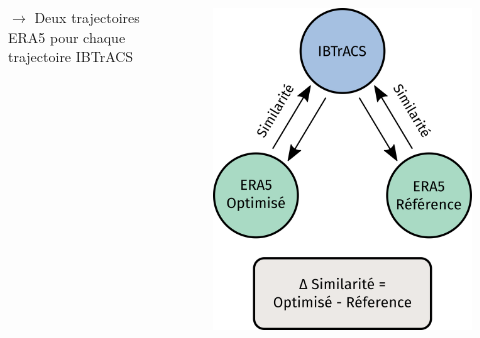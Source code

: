 \documentclass[aspectratio=169, usepdftitle=false, xcolor={dvipsnames}, 9pt,table]{beamer}
\begin{document}
\begin{frame}[c]
\begin{columns}
\begin{column}{0.6\textwidth}
\begin{block}
\begin{itemize}
\begin{itemize}
                         \end{itemize}
                \end{itemize}
                $\longrightarrow$ \alert{Deux trajectoires} ERA5 pour chaque trajectoire IBTrACS
            \end{block}
         \end{column}
         \begin{column}{0.4\textwidth}
             \vspace{-2em} 
             \begin{figure}
                 \centering
                 \includegraphics[width=\textwidth]{Figures/schema_application_similarite.png}
             \end{figure} 
         \end{column}
     \end{columns}
 \end{frame}
 
\end{document}

